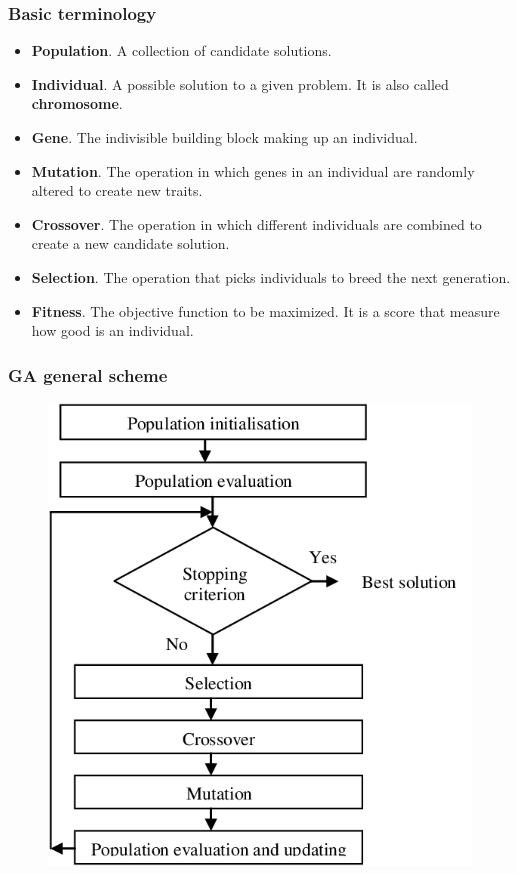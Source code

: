 \documentclass{beamer}
\begin{document}
	\begin{frame}
		\frametitle{Basic terminology}
		\begin{itemize}
			\item \textbf{Population}. A collection of candidate solutions.
			\item \textbf{Individual}. A possible solution to a given problem. It is also called \textbf{chromosome}.
			\item \textbf{Gene}. The indivisible building block making up an individual.
			\item \textbf{Mutation}. The operation in which genes in an individual are randomly altered to create new traits.
			\item \textbf{Crossover}. The operation in which different individuals are combined to create a new candidate solution.
			\item \textbf{Selection}. The operation that picks individuals to breed the next generation.
			\item \textbf{Fitness}. The objective function to be maximized. It is a score that measure how good is an individual.
		\end{itemize}
	\end{frame}

	\begin{frame}
		\frametitle{GA general scheme}
		\begin{figure}
			\centering
			\includegraphics[scale=0.3]{images/ga_scheme}
		\end{figure}
		
	\end{frame}
	
\end{document}
